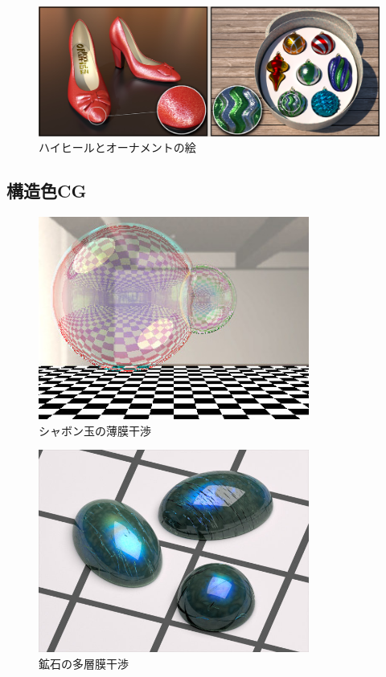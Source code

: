 \begin{figure}[hn]
  \centering
  \includegraphics[width=5.0in]{./img/heel_ornament.jpg}
  \caption{ハイヒールとオーナメントの絵\cite{jakob2014discrete}}
  \label{F}
\end{figure}


\subsection{構造色CG}

\begin{figure}[htbp]
  \centering
  \includegraphics[width=3.5in]{./img/syabon_iwasaki.jpg}
  \caption{シャボン玉の薄膜干渉\cite{}}
  \label{FSyabon}
\end{figure}

\begin{figure}[htbp]
  \centering
  \includegraphics[width=3.5in]{./img/kouseki_weidlich.jpg}
  \caption{鉱石の多層膜干渉\cite{}}
  \label{FKouseki}
\end{figure}

